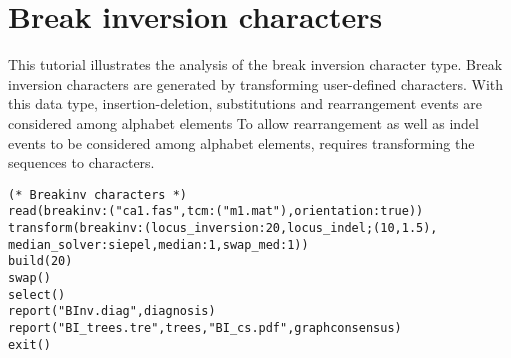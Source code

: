 
\section{Break inversion characters}{\label{tutorial 13}}

This tutorial illustrates the analysis of the break inversion character type.  Break inversion characters are generated 
by transforming user-defined  characters.  With this data type, insertion-deletion, 
substitutions and rearrangement events are considered among alphabet elements
To allow rearrangement as well as indel events to be considered among alphabet elements, requires 
 transforming the  sequences to  characters. 

\begin{verbatim}
(* Breakinv characters *)
read(breakinv:("ca1.fas",tcm:("m1.mat"),orientation:true))
transform(breakinv:(locus_inversion:20,locus_indel;(10,1.5),
median_solver:siepel,median:1,swap_med:1))
build(20)
swap()
select()
report("BInv.diag",diagnosis)
report("BI_trees.tre",trees,"BI_cs.pdf",graphconsensus)
exit()
\end{verbatim}

